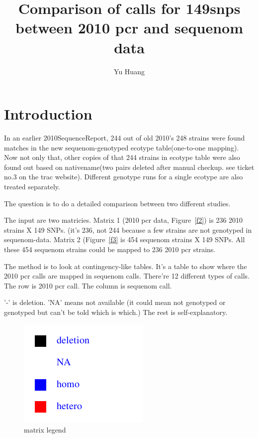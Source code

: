 \documentclass[a4paper,10pt]{article}
\title{Comparison of calls for 149snps between 2010 pcr and sequenom data}
\author{Yu Huang}
\begin{document}
\maketitle

\begin{abstract}

\end{abstract}

\tableofcontents


\section{Introduction}
In an earlier 2010SequenceReport, 244 out of old 2010's 248 strains were found matches in the new sequenom-genotyped ecotype table(one-to-one mapping). Now not only that, other copies of that 244 strains in ecotype table were also found out based on nativename(two pairs deleted after manual checkup. see ticket no.3 on the trac website). Different genotype runs for a single ecotype are also treated separately.

The question is to do a detailed comparison between two different studies.

The input are two matricies. Matrix 1 (2010 pcr data, Figure~\ref{f2}) is 236 2010 strains X 149 SNPs. (it's 236, not 244 because a few strains are not genotyped in sequenom-data. Matrix 2 (Figure~\ref{f3} is 454 sequenom strains X 149 SNPs. All these 454 sequenom strains could be mapped to 236 2010 pcr strains.

The method is to look at contingency-like tables. It's a table to show where the 2010 pcr calls are mapped in sequenom calls. There're 12 different types of calls. The row is 2010 pcr call. The column is sequenom call.

'-' is deletion. 'NA' means not available (it could mean not genotyped or genotyped but can't be told which is which.) The rest is self-explanatory.

\begin{figure}
\includegraphics{figures/2010pcr_with_sequenom_149snps_accession2ecotype_complete_y3_legend.png}
\caption{matrix legend}\label{f1}
\end{figure}
\end{document}
